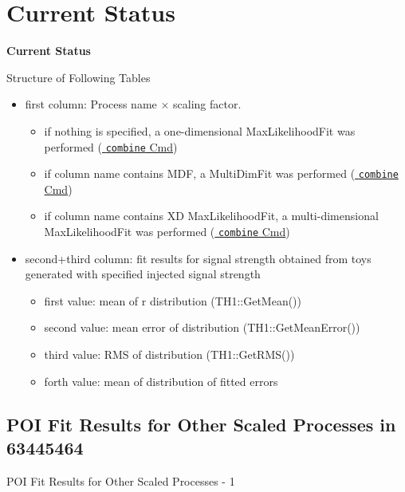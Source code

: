 \section{Current Status}
\begin{frame}
\centering
\textbf{\Huge{Current Status}}
\end{frame}

\begin{frame}{Structure of Following Tables}
\begin{itemize}
\item first column: Process name $\times$ scaling factor.
\begin{itemize}
\item if nothing is specified, a one-dimensional MaxLikelihoodFit was performed (\hyperlink{1DML}{\color{blue} \texttt{combine} Cmd})
\item if column name contains MDF, a MultiDimFit was performed (\hyperlink{MDF}{\color{blue} \texttt{combine} Cmd})
\item if column name contains XD MaxLikelihoodFit, a multi-dimensional MaxLikelihoodFit was performed (\hyperlink{MDML}{\color{blue} \texttt{combine} Cmd})
\end{itemize}
\item second+third column: fit results for signal strength obtained from toys generated with specified injected signal strength
\begin{itemize}
\item first value: mean of r distribution (TH1::GetMean())
\item second value: mean error of distribution (TH1::GetMeanError())
\item third value: RMS of distribution (TH1::GetRMS())
\item forth value: mean of distribution of fitted errors
\end{itemize}
\end{itemize}
\end{frame}

\subsection{POI Fit Results for Other Scaled Processes in 63445464}

\begin{frame}{POI Fit Results for Other Scaled Processes - 1}
\begin{scriptsize}
% 
\end{scriptsize}

\end{frame}


